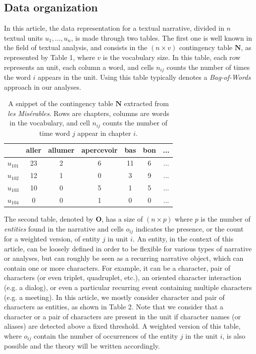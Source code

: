 \documentclass[
twocolumn,
]{ceurart}
\begin{document}
\subsection{Data organization}

In this article, the data representation for a textual narrative, divided in $n$ textual units $u_1, \ldots, u_n$, is made through two tables. The first one is well known in the field of textual analysis, and consists in the $(n \times v)$ contingency table $\mathbf{N}$, as represented by Table 1, where $v$ is the vocabulary size. In this table, each row represents an unit, each column a word, and cells $n_{ij}$ counts the number of times the word $i$ appears in the unit. Using this table typically denotes a \emph{Bag-of-Words} approach in our analyses.

\begin{table}[h]
	\scriptsize
	\begin{tabular}{|c||c|c|c|c|c|c|}
		\hline
		& aller & allumer & apercevoir & bas & bon & ... \\
		\hline
		\hline 
		$u_{101}$ & 23 & 2 & 6 & 11 & 6 & ... \\
		\hline
		$u_{102}$ & 12 & 1 & 0 & 3 & 9 & ... \\
		\hline
		$u_{103}$ & 10 & 0 & 5 & 1 & 5 & ... \\
		\hline
		$u_{104}$ & 0 & 0 & 1 & 0 & 0 & ... \\
		\hline
	\end{tabular}
	\label{cont_table}
	\caption{A snippet of the contingency table $\mathbf{N}$ extracted from \emph{les Misérables}. Rows are chapters, columns are words in the vocabulary, and cell $n_{ij}$ counts the number of time word $j$ appear in chapter $i$.}
\end{table}

The second table, denoted by $\mathbf{O}$, has a size of $(n \times p)$ where $p$ is the number of \emph{entities} found in the narrative and cells $o_{ij}$ indicates the presence, or the count for a weighted version, of entity $j$ in unit $i$. An entity, in the context of this article, can be loosely defined in order to be flexible for various types of narrative or analyses, but can roughly be seen as a recurring narrative object, which can contain one or more characters. For example, it can be a character, pair of characters (or even triplet, quadruplet, etc.), an oriented character interaction (e.g. a dialog), or even a particular recurring event containing multiple characters (e.g. a meeting). In this article, we mostly consider character and pair of characters as entities, as shown in Table 2. Note that we consider that a character or a pair of characters are present in the unit if character names (or aliases) are detected above a fixed threshold. A weighted version of this table, where $o_{ij}$ contain the number of occurrences of the entity $j$ in the unit $i$, is also possible and the theory will be written accordingly.
\end{document}
